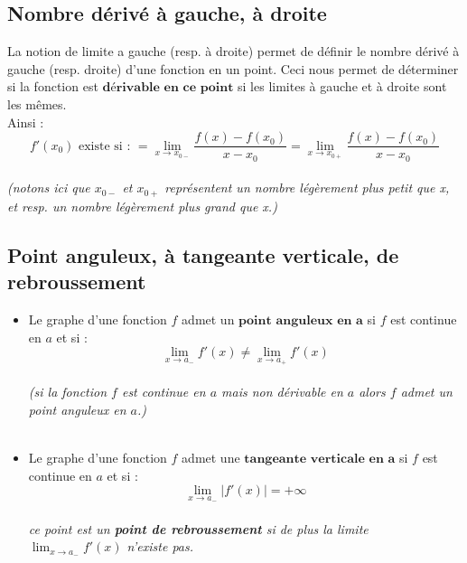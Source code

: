 \documentclass[12pt, a4paper]{book}
\begin{document}
\subsection{Nombre dérivé à gauche, à droite}
    La notion de limite a gauche (resp. à droite) permet de définir le nombre dérivé à gauche (resp. droite) d'une fonction en un point.
    Ceci nous permet de déterminer si la fonction est $\textbf{dérivable en ce point}$ si les limites à gauche et à droite sont les mêmes.\\
    Ainsi :
    $$
    \boxed{
    f'(x_{0}) \text{ existe si : }= \lim_{x \to x_{0-}} \frac{f(x)-f(x_0)}{x-x_0} = \lim_{x \to x_{0+}} \frac{f(x)-f(x_0)}{x-x_0}
    }
    $$\\
    \textit{(notons ici que $x_{0-}$ et $x_{0+}$ représentent un nombre légèrement plus petit que x, et  resp. un nombre légèrement plus grand que x.)}
\newpage
\subsection{Point anguleux, à tangeante verticale, de rebroussement}
\begin{itemize}

    \item Le graphe d'une fonction $f$ admet un $\textbf{point anguleux en a}$ si $f$ est continue en $a$ et si :\\
$$\boxed{
\lim_{x \to a_{-}}f'(x) \not = \lim_{x \to a_{+}}f'(x)
}
$$\\
\textit{(si la fonction $f$ est continue en $a$ mais non dérivable en $a$ alors $f$ admet un point anguleux en $a$.)}\\
\\
\item Le graphe d'une fonction $f$ admet une $\textbf{tangeante verticale en a}$ si $f$ est continue en $a$ et si :\\
$$\boxed{
\lim_{x \to a_{-} } \lvert f'(x) \rvert = +\infty
}
$$\\
\textit{ce point est un \textbf{point de rebroussement} si de plus la limite $\lim_{x \to a_{-}}f'(x) $ n'existe pas.}\\
\\
\end{itemize}
\end{document}
